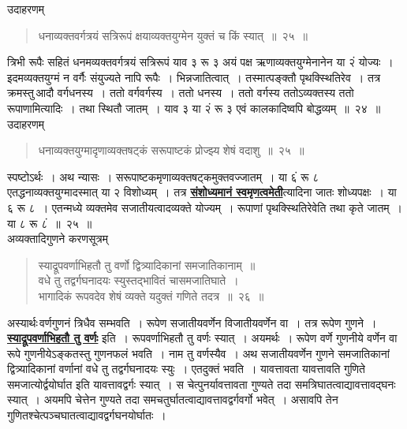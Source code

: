 \documentclass[11pt, openany]{book}
\begin{document}
\vspace{-2mm}
{\bqt उदाहरणम्}
\begin{quote}
    \eg
    धनाव्यक्तवर्गत्रयं सत्रिरूपं क्षयाव्यक्तयुग्मेन युक्तं च किं स्यात्~॥~२५~॥
\end{quote}
\newpage %
त्रिभी रूपैः सहितं धनमव्यक्तवर्गत्रयं सत्रिरूपं याव ३ रू ३ अयं पक्ष
ऋणाव्यक्तयुग्मेनानेन या २ं योज्यः~। इदमव्यक्तयुग्मं न वर्गैः संयुज्यते
नापि रूपैः~। भिन्नजातित्वात्~। तस्मात्पङ्क्तौ पृथक्स्थितिरेव~। तत्र क्रमस्तु\textendash \,आदौ
वर्गधनस्य~। ततो वर्गवर्गस्य~। ततो धनस्य~। ततो वर्गस्य ततोऽव्यक्तस्य ततो
रूपाणामित्यादिः~। तथा स्थितौ जातम्~। याव ३ या २ं रू ३ एवं कालकादिष्वपि बोद्धव्यम्~॥~२४~॥\\ 

\vspace{-2mm}
{\bqt उदाहरणम्}
\begin{quote}
    \eg
    धनाव्यक्तयुग्मादृणाव्यक्तषट्कं सरूपाष्टकं प्रोज्झ्य शेषं वदाशु~॥~२५~॥
\end{quote}

स्पष्टोऽर्थः~। अथ न्यासः~। सरूपाष्टकमृणाव्यक्तषट्कमुक्तवज्जातम्~। या ६ं
रू ८ एतद्धनाव्यक्तयुग्मादस्मात् या २ विशोध्यम्~। तत्र \hyperref[7]{\textbf{संशोध्यमानं स्वमृणत्वमेती}}त्यादिना जातः शोध्यपक्षः~। या ६ रू ८~। एतन्मध्ये व्यक्तमेव सजातीयत्वादव्यक्ते योज्यम्~। रूपाणां पृथक्स्थितिरेवेति तथा कृते जातम्~। या ८ रू ८ं~॥~२५~॥~\\

\vspace{-2mm}
{\bqt अव्यक्तादिगुणने करणसूत्रम्\textendash \,}

 \label{26}
\begin{quote}
    \ab
    स्याद्रूपवर्णाभिहतौ तु वर्णो द्वित्र्यादिकानां समजातिकानाम्~॥\\
वधे तु तद्वर्गघनादयः स्युस्तद्भावितं चासमजातिघाते~।\\
भागादिकं रूपवदेव शेषं व्यक्ते यदुक्तं गणिते तदत्र~॥~२६~॥
\end{quote}

अस्यार्थः\textendash \,वर्णगुणनं त्रिधैव सम्भवति~। रूपेण सजातीयवर्णेन विजातीयवर्णेन वा~। तत्र रूपेण गुणने~। \hyperref[26]{\textbf{स्याद्रूपवर्णाभिहतौ तु वर्णः}} इति~। रूपवर्णाभिहतौ तु
वर्णः स्यात्~। अयमर्थः~। रूपेण वर्णे गुणनीये वर्णेन वा रूपे गुणनीयेऽङ्कतस्तु
गुणनफलं भवति~। नाम तु वर्णस्यैव~। अथ सजातीयवर्णेन गुणने समजातिकानां
द्वित्र्यादिकानां वर्णानां वधे तु तद्वर्गघनादयः स्युः~। एतदुक्तं भवति~। यावत्तावता
यावत्तावति गुणिते समजात्योर्द्वयोर्घात इति यावत्तावद्वर्गः स्यात्~। स
चेत्पुनर्यावत्तावता गुण्यते तदा समत्रिघातत्वाद्यावत्तावद्घनः स्यात्~। अयमपि चेत्तेन गुण्यते तदा समचतुर्घातत्वाद्यावत्तावद्वर्गवर्गो भवेत्~। असावपि तेन गुणितश्चेत्पञ्चघातत्वाद्यावद्वर्गघनयोर्घातः~।\\
\end{document}
